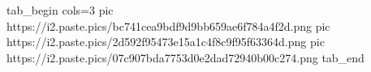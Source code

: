  
 
 
 
 

\ifcmt
  tab_begin cols=3
     pic https://i2.paste.pics/bc741cea9bdf9d9bb659ae6f784a4f2d.png
		 pic https://i2.paste.pics/2d592f95473e15a1c4f8c9f95f63364d.png
     pic https://i2.paste.pics/07c907bda7753d0e2dad72940b00c274.png
  tab_end
\fi
